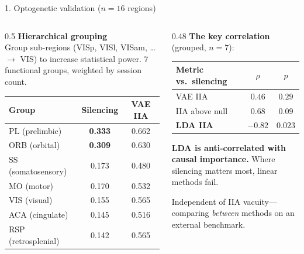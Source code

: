 \documentclass[aspectratio=169,11pt]{beamer}
\begin{document}
\begin{frame}{1. Optogenetic validation ($n = 16$ regions)}
\begin{columns}[T]
\begin{column}{0.5\textwidth}
\textbf{Hierarchical grouping}\\[0.3em]
{\small Group sub-regions (VISp, VISl, VISam, \ldots $\to$ VIS) to increase statistical power. 7 functional groups, weighted by session count.}

\vspace{0.5em}
{\scriptsize
\begin{tabular}{lcc}
\toprule
\textbf{Group} & \textbf{Silencing} & \textbf{VAE IIA} \\
\midrule
PL (prelimbic) & \textbf{0.333} & 0.662 \\
ORB (orbital) & \textbf{0.309} & 0.630 \\
SS (somatosensory) & 0.173 & 0.480 \\
MO (motor) & 0.170 & 0.532 \\
VIS (visual) & 0.155 & 0.565 \\
ACA (cingulate) & 0.145 & 0.516 \\
RSP (retrosplenial) & 0.142 & 0.565 \\
\bottomrule
\end{tabular}
}
\end{column}
\begin{column}{0.48\textwidth}
\textbf{The key correlation} {\scriptsize (grouped, $n = 7$):}

\vspace{0.3em}
{\scriptsize
\begin{tabular}{lcc}
\toprule
\textbf{Metric vs.\ silencing} & $\rho$ & $p$ \\
\midrule
VAE IIA & $0.46$ & $0.29$ \\
IIA above null & $0.68$ & $0.09$ \\
\textbf{LDA IIA} & $\mathbf{-0.82}$ & $\mathbf{0.023}$ \\
\bottomrule
\end{tabular}
}

\vspace{1em}
{\small \textbf{LDA is anti-correlated with causal importance.} Where silencing matters most, linear methods fail.}

\vspace{0.5em}
{\small Independent of IIA vacuity---comparing \emph{between} methods on an external benchmark.}
\end{column}
\end{columns}
\end{frame}
\end{document}
